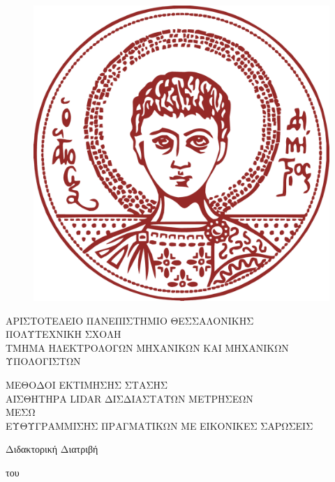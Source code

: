 \begin{center}

  \begin{figure}\centering\vspace{-2cm}
    \includegraphics[scale=0.2]{./figures/parts/00/auth_logo.png}
  \end{figure}


  {ΑΡΙΣΤΟΤΕΛΕΙΟ ΠΑΝΕΠΙΣΤΗΜΙΟ ΘΕΣΣΑΛΟΝΙΚΗΣ\\
   \vspace{-0.2cm}
   ΠΟΛΥΤΕΧΝΙΚΗ ΣΧΟΛΗ\\
   \vspace{-0.2cm}
   ΤΜΗΜΑ ΗΛΕΚΤΡΟΛΟΓΩΝ ΜΗΧΑΝΙΚΩΝ ΚΑΙ ΜΗΧΑΝΙΚΩΝ ΥΠΟΛΟΓΙΣΤΩΝ} \\

   \vspace{2cm}

   {\large ΜΕΘΟΔΟΙ ΕΚΤΙΜΗΣΗΣ ΣΤΑΣΗΣ \\ ΑΙΣΘΗΤΗΡΑ LIDAR ΔΙΣΔΙΑΣΤΑΤΩΝ ΜΕΤΡΗΣΕΩΝ \\ ΜΕΣΩ \\ΕΥΘΥΓΡΑΜΜΙΣΗΣ ΠΡΑΓΜΑΤΙΚΩΝ ΜΕ ΕΙΚΟΝΙΚΕΣ ΣΑΡΩΣΕΙΣ}

   \vspace{1.7cm}

   {Διδακτορική Διατριβή}

   {του}


\end{center}
